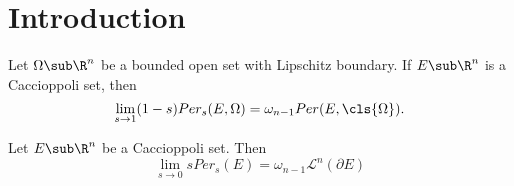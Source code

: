 \documentclass[../main.tex]{subfiles}
\begin{document}
\section{Introduction}

\begin{maintheorem}\label{sto1}
    Let $ \Omega\sub \R^{n} $ be a bounded open set with Lipschitz boundary. If $ E\sub \R^{n} $ is a Caccioppoli set, then
    \begin{equation}
        \lim_{s\to1}(1-s) Per_{s}(E, \Omega) = \omega_{n-1} Per(E,\cls{\Omega}).
    \end{equation}
\end{maintheorem}


\begin{maintheorem}\label{sto0}
    Let $ E\sub \R^{n} $ be a Caccioppoli set. Then 
    \begin{equation}
        \lim_{s\to0} sPer_{s}(E) = \omega_{n-1} \mathcal{L}^{n}(\partial E)
    \end{equation}
\end{maintheorem}
\end{document}
